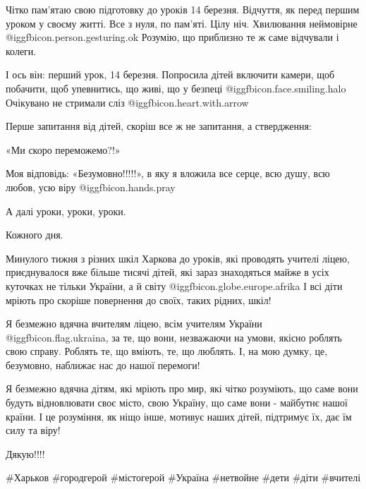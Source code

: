 Чітко пам’ятаю свою підготовку до уроків 14 березня. Відчуття, як перед першим
уроком у своєму житті. Все з нуля, по пам’яті. Цілу ніч. Хвилювання неймовірне
 @igg{fbicon.person.gesturing.ok}  Розумію, що приблизно те ж саме відчували і колеги.

І ось він: перший урок, 14 березня. Попросила дітей включити камери, щоб
побачити, щоб упевнитись, що живі, що у безпеці  @igg{fbicon.face.smiling.halo}
Очікувано не стримали сліз  @igg{fbicon.heart.with.arrow} 

Перше запитання від дітей, скоріш все ж не запитання, а ствердження:

«Ми скоро переможемо?!»

Моя відповідь: «Безумовно!!!!!», в яку я вложила все серце, всю душу, всю
любов, усю віру  @igg{fbicon.hands.pray} 

А далі уроки, уроки, уроки.

Кожного дня.

Минулого тижня з різних шкіл Харкова до уроків, які проводять учителі ліцею,
приєднувалося вже більше тисячі дітей, які зараз знаходяться майже в усіх
куточках не тільки України, а й світу  @igg{fbicon.globe.europe.afrika}  І всі діти мріють про скоріше
повернення до своїх, таких рідних, шкіл!

Я безмежно вдячна вчителям ліцею, всім учителям України @igg{fbicon.flag.ukraina}, за те, що вони,
незважаючи на умови, якісно роблять свою справу. Роблять те, що вміють, те, що
люблять. І, на мою думку, це, безумовно, наближає нас до нашої перемоги!

Я безмежно вдячна дітям, які мріють про мир, які чітко розуміють, що саме вони
будуть відновлювати своє місто, свою Україну, що саме вони - майбутнє нашої
країни. І це розуміння, як ніщо інше, мотивує наших дітей, підтримує їх, дає їм
силу та віру! 

Дякую!!!! 

\#Харьков \#городгерой \#містогерой \#Україна \#нетвойне \#дети \#діти \#вчителі

